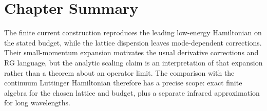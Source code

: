 \section{Chapter Summary}
The finite current construction reproduces the leading low-energy
Hamiltonian on the stated budget, while the lattice dispersion leaves
mode-dependent corrections. Their small-momentum expansion motivates the
usual derivative corrections and RG language, but the analytic scaling
claim is an interpretation of that expansion rather than a theorem about
an operator limit. The comparison with the continuum Luttinger Hamiltonian
therefore has a precise scope: exact finite algebra for the chosen lattice
and budget, plus a separate infrared approximation for long wavelengths.
